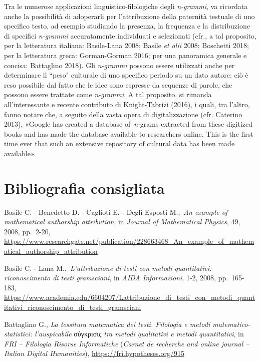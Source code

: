 \documentclass[
  b5paper,
  twoside,
  12pt,
  chapterprefix=false,
  bibliography=totocnumbered,
  parskip=false]{scrbook}
\begin{document}
Tra le numerose applicazioni linguistico-filologiche degli \emph{n-grammi},
va ricordata anche la possibilità di adoperarli per l'attribuzione della
paternità testuale di uno specifico testo, ad esempio studiando la
presenza, la frequenza e la distribuzione di specifici \emph{n-grammi}
accuratamente individuati e selezionati (cfr., a tal proposito, per la
letteratura italiana: Basile-Lana 2008; Basile \emph{et alii} 2008; Boschetti
2018; per la letteratura greca: Gorman-Gorman 2016; per una panoramica
generale e concisa: Battaglino 2018). Gli \emph{n-grammi} possono essere
utilizzati anche per determinare il ``peso" culturale di uno specifico
periodo su un dato autore: ciò è reso possibile dal fatto che le idee
sono espresse da sequenze di parole, che possono essere trattate come
\emph{n-grammi}. A tal proposito, si rimanda all'interessante e recente
contributo di Knight-Tabrizi (2016), i quali, tra l'altro, fanno notare
che, a seguito della vasta opera di digitalizzazione (cfr. Caterino
2013), «Google has created a database of~\emph{n}-grams extracted from these
digitized books and has made the database available to researchers
online. This is the first time ever that such an extensive repository of
cultural data has been made available».

\hypertarget{bibliografia-consigliata-16}{%
\section*{Bibliografia consigliata}\label{bibliografia-consigliata-16}}

Basile C. - Benedetto D. - Caglioti E. - Degli Esposti M.,~\emph{An example
of mathematical authorship attribution}, in \emph{Journal of Mathematical
Physics}, 49, 2008, pp.~2-20,
\url{https://www.researchgate.net/publication/228663468_An_example_of_mathematical_authorship_attribution}

Basile C. - Lana M.,~\emph{L'attribuzione di testi con metodi quantitativi:
riconoscimento di testi gramsciani}, in \emph{AIDA Informazioni}, 1-2, 2008,
pp.~165-183,
\url{https://www.academia.edu/6604207/Lattribuzione_di_testi_con_metodi_quantitativi_riconoscimento_di_testi_gramsciani}

Battaglino G., \emph{La tessitura matematica dei testi. Filologia e metodi
matematico-statistici: l'auspicabile} σύγκρισις \emph{tra metodi qualitativi
e metodi quantitativi}, in \emph{FRI -- Filologia Risorse Informatiche}
(\emph{Carnet de recherche and online journal -- Italian Digital
Humanities}),
\url{https://fri.hypotheses.org/915}
\end{document}
